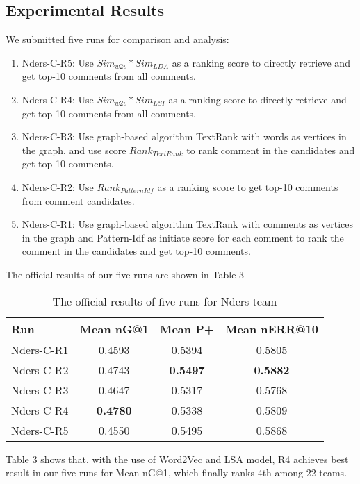\documentclass{llncs}
\begin{document}
\subsection{Experimental Results}
We submitted five runs for comparison and analysis:

\begin{enumerate}
  \item{Nders-C-R5: } Use $Sim_{w2v}*Sim_{LDA}$ as a ranking score to directly 
  retrieve and get top-10 comments from all comments.
  \item{Nders-C-R4: } Use $Sim_{w2v}*Sim_{LSI}$ as a ranking score to directly 
  retrieve and get top-10 comments from all comments.
  \item{Nders-C-R3: } Use graph-based algorithm TextRank with words as vertices
  in the graph, and use score $Rank_{TextRank}$ to rank comment in the 
  candidates and get top-10 comments.
  \item{Nders-C-R2: } Use $Rank_{PatternIdf}$ as a ranking score to get top-10 comments from comment candidates.
  \item{Nders-C-R1: } Use graph-based algorithm TextRank with comments as vertices in the graph and Pattern-Idf as initiate score for each comment to 
  rank the comment in the candidates and get top-10 comments.
\end{enumerate}

The official results of our five runs are shown in Table 3
\begin{table}[]
\centering
\caption{The official results of five runs for Nders team}
\label{my-label}
\begin{tabular}{|l@{\quad}|c|c|c|}
\hline
 Run  \quad & \quad Mean nG@1 \quad & \quad Mean P+ \quad & \quad Mean nERR@10 \quad \\ \hline
 Nders-C-R1 & 0.4593 & 0.5394 & 0.5805 \\ \hline
 Nders-C-R2 & 0.4743 & \textbf{0.5497} & \textbf{0.5882} \\ \hline
 Nders-C-R3 & 0.4647 & 0.5317 & 0.5768 \\ \hline
 Nders-C-R4 & \textbf{0.4780} & 0.5338 & 0.5809 \\ \hline
 Nders-C-R5 & 0.4550 & 0.5495 & 0.5868 \\ \hline
\end{tabular}
\end{table}

Table 3 shows that, with the use of Word2Vec and LSA model, R4 achieves 
best result in our five runs for Mean nG@1, which finally ranks 4th among 22 
teams. 
\end{document}
